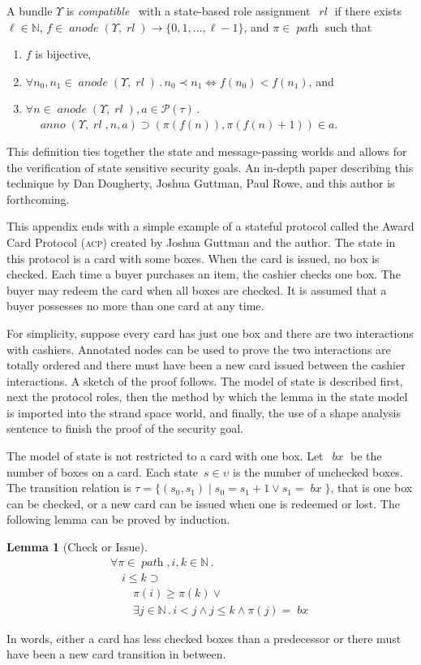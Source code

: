 \documentclass[titlepage,12pt]{article}
\newtheorem{lem}{Lemma}
\newcommand{\acp}{\textsc{acp}}
\newcommand{\fn}[1]{\ensuremath{\operatorname{\mathit{#1}}}}
\newcommand{\nat}{\ensuremath{\mathbb{N}}}
\newcommand{\all}[1]{\forall#1\mathpunct.}
\newcommand{\some}[1]{\exists#1\mathpunct.}
\newcommand{\pow}[1]{\mathcal P(#1)}
\newcommand{\rl}{\fn{rl}}
\begin{document}
A bundle $\Upsilon$ is \emph{compatible}~\cite[Def.~11]{Guttman12} with a
state-based role assignment~{\rl} if there exists $\ell\in\nat$,
$f\in\fn{anode}(\Upsilon,\rl)\to\{0,1,\ldots,\ell-1\}$, and
$\pi\in\fn{path}$ such that
\begin{enumerate}
\item $f$ is bijective,
\item $\all{n_0,n_1\in\fn{anode}(\Upsilon,\rl)}
n_0\prec n_1\Longleftrightarrow f(n_0)<f(n_1)$, and
\item $\all{n\in\fn{anode}(\Upsilon,\rl),a\in\pow{\tau}}$\\
$\mbox{}\quad\fn{anno}(\Upsilon,\rl,n,a)\supset
(\pi(f(n)),\pi(f(n)+1))\in a$.
\end{enumerate}
This definition ties together the state and message-passing worlds and
allows for the verification of state sensitive security goals.  An
in-depth paper describing this technique by Dan Dougherty, Joshua
Guttman, Paul Rowe, and this author is forthcoming.

This appendix ends with a simple example of a stateful protocol called
the Award Card Protocol ({\acp}) created by Joshua Guttman and the
author.  The state in this protocol is a card with some boxes.  When
the card is issued, no box is checked.  Each time a buyer purchases an
item, the cashier checks one box.  The buyer may redeem the card when
all boxes are checked.  It is assumed that a buyer possesses no more
than one card at any time.

For simplicity, suppose every card has just one box and there are two
interactions with cashiers.  Annotated nodes can be used to prove the
two interactions are totally ordered and there must have been a new
card issued between the cashier interactions.  A sketch of the proof
follows.  The model of state is described first, next the protocol
roles, then the method by which the lemma in the state model is
imported into the strand space world, and finally, the use of a shape
analysis sentence to finish the proof of the security goal.

The model of state is not restricted to a card with one box.
Let~\fn{bx} be the number of boxes on a card.  Each
state~$s\in\upsilon$ is the number of unchecked boxes.  The transition
relation is $\tau=\{(s_0,s_1)\mid s_0=s_1+1\lor s_1=\fn{bx}\}$, that
is one box can be checked, or a new card can be issued when one is
redeemed or lost.  The following lemma can be proved by induction.
\begin{lem}[Check or Issue]\label{lem:check or issue}
$$\begin{array}{l}
\all{\pi\in\fn{path},i,k\in\nat}\\
\quad i\leq k\supset{}\\
\qquad \pi(i)\geq \pi(k)\lor{}\\
\qquad \some{j\in\nat}
i<j\land j\leq k\land \pi(j)=\fn{bx}
\end{array}$$
\end{lem}
In words, either a card has less checked boxes than a predecessor or
there must have been a new card transition in between.
\end{document}
